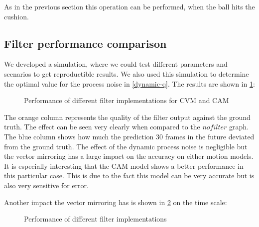 \documentclass[notitlepage, a4paper, 11pt]{scrartcl}
\begin{document}
\begin{multicols}{2}
As in the previous section this operation can be performed, when the ball hits the cushion.


\subsection{Filter performance comparison} \label{perf-comp}

We developed a simulation, where we could test different parameters and scenarios to get reproductible results. 
We also used this simulation to determine the optimal value for the process noise in \cref{dynamic-q}. The results are shown in \cref{fig:sim-results}:

\begin{figure}[H]
    \centering
    \caption{Performance of different filter implementations for CVM and CAM}
    \label{fig:sim-results}
\end{figure}

The orange column represents the quality of the filter output against the ground truth. 
The effect can be seen very clearly when compared to the $no filter$ graph. 
The blue column shows how much the prediction 30 frames in the future deviated from the ground truth.
The effect of the dynamic process noise is negligible but the vector mirroring has a large impact on the accuracy on either motion models.
It is especially interesting that the CAM model shows a better performance in this particular case. 
This is due to the fact this model can be very accurate but is also very sensitive for error.

Another impact the vector mirroring has is shown in \cref{fig:deviation-noise} on the time scale:

\begin{figure}[H]
    \centering
    \caption{Performance of different filter implementations}
    \label{fig:deviation-noise}
\end{figure}


\end{multicols}
\end{document}
